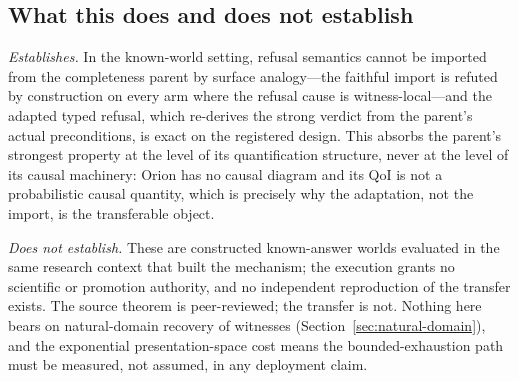 \subsection{What this does and does not establish}

\emph{Establishes.} In the known-world setting, refusal semantics cannot be imported from the completeness parent by surface analogy---the faithful import is refuted by construction on every arm where the refusal cause is witness-local---and the adapted typed refusal, which re-derives the strong verdict from the parent's actual preconditions, is exact on the registered design. This absorbs the parent's strongest property at the level of its quantification structure, never at the level of its causal machinery: Orion has no causal diagram and its QoI is not a probabilistic causal quantity, which is precisely why the adaptation, not the import, is the transferable object.

\emph{Does not establish.} These are constructed known-answer worlds evaluated in the same research context that built the mechanism; the execution grants no scientific or promotion authority, and no independent reproduction of the transfer exists. The source theorem is peer-reviewed; the transfer is not. Nothing here bears on natural-domain recovery of witnesses (Section~\ref{sec:natural-domain}), and the exponential presentation-space cost means the bounded-exhaustion path must be measured, not assumed, in any deployment claim.
